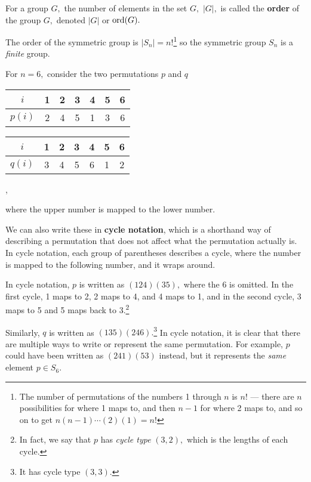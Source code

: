\begin{definition}
For a group $G,$ the number of elements in the set $G,$ $|G|,$ is called the \textbf{order} of the group $G,$ denoted $|G|$ or $\operatorname{ord}(G).$
\end{definition}

The order of the symmetric group is $|S_n| = n!$\footnote{The number of permutations of the numbers 1 through $n$ is $n!$ --- there are $n$ possibilities for where 1 maps to, and then $n-1$ for where 2 maps to, and so on to get $n(n-1)\cdots (2)(1) = n!$} so the symmetric group $S_n$ is a \emph{finite} group. 

For $n=6,$ consider the two permutations $p$ and $q$
\begin{center}
    \begin{tabular}{c|c c c c c c}
     $i$ & 1 & 2 & 3 & 4 & 5 & 6 \\
     \hline 
     $p(i)$ & 2 & 4 & 5 & 1 & 3 & 6
\end{tabular}
\end{center}
\begin{center}
    \begin{tabular}{c|c c c c c c}
     $i$ & 1 & 2 & 3 & 4 & 5 & 6 \\
     \hline 
     $q(i)$ & 3 & 4 & 5 & 6 & 1 & 2
\end{tabular},
\end{center}
where the upper number is mapped to the lower number. 

We can also write these in \textbf{cycle notation}, which is a shorthand way of describing a permutation that does not affect what the permutation actually is. In cycle notation, each group of parentheses describes a cycle, where the number is mapped to the following number, and it wraps around. 
\begin{example}
In cycle notation, $p$ is written as $(124)(35),$ where the 6 is omitted. In the first cycle, 1 maps to 2, 2 maps to 4, and 4 maps to 1, and in the second cycle, 3 maps to 5 and 5 maps back to 3.\footnote{In fact, we say that $p$ has \emph{cycle type} $(3, 2),$ which is the lengths of each cycle.} 
\end{example}

Similarly, $q$ is written as $(135)(246).$\footnote{It has cycle type $(3, 3).$} In cycle notation, it is clear that there are multiple ways to write or represent the same permutation. For example, $p$ could have been written as $(241)(53)$ instead, but it represents the \emph{same} element $p \in S_6.$

